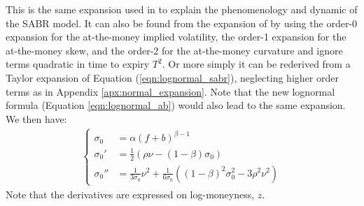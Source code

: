 \documentclass[]{rAMF2e}
\begin{document}
This is the same expansion used in \citep[equation (3.1a)]{hagan2002managing} to explain the phenomenology and dynamic of the SABR model. It can also be found from the expansion of \citep{lorig2014implied} by using the order-0 expansion for the at-the-money implied volatility, the order-1 expansion for the at-the-money skew, and the order-2 for the at-the-money curvature and ignore terms quadratic in time to expiry $T^2$. Or more simply it can be rederived from a Taylor expansion of Equation (\ref{eqn:lognormal_sabr}), neglecting higher order terms as in Appendix \ref{apx:normal_expansion}. Note that the new lognormal formula (Equation \ref{eqn:lognormal_ab}) would also lead to the same expansion. We then have:
\begin{align}
\begin{cases}
\sigma_0 &= \alpha(f+b)^{\beta-1}\\
\sigma_0' &= \frac{1}{2}\left(\rho \nu - (1-\beta)\sigma_0\right)\\
\sigma_0'' &= \frac{1}{3\sigma_0}\nu^2+\frac{1}{6\sigma_0}\left((1-\beta)^2\sigma_0^2 - 3\rho^2\nu^2\right)
\end{cases}
\end{align} 
Note that the derivatives are expressed on log-moneyness, $z$.
\end{document}
